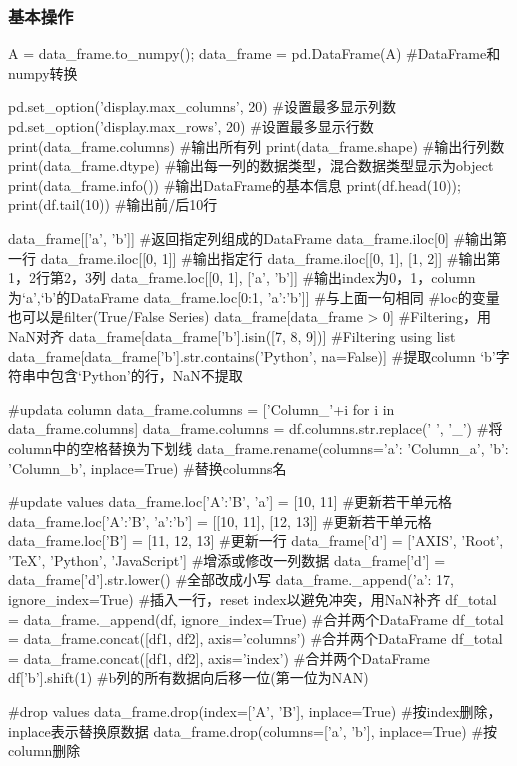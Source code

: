     \subsubsection{基本操作}
      \begin{codeblock}[language=python, caption={Basic functions about DataFrame}]
        A = data_frame.to_numpy(); data_frame = pd.DataFrame(A) #DataFrame和numpy转换

        pd.set_option('display.max_columns', 20) #设置最多显示列数
        pd.set_option('display.max_rows', 20) #设置最多显示行数
        print(data_frame.columns) #输出所有列
        print(data_frame.shape) #输出行列数
        print(data_frame.dtype) #输出每一列的数据类型，混合数据类型显示为object
        print(data_frame.info()) #输出DataFrame的基本信息
        print(df.head(10)); print(df.tail(10)) #输出前/后10行

        data_frame[['a', 'b']] #返回指定列组成的DataFrame
        data_frame.iloc[0] #输出第一行
        data_frame.iloc[[0, 1]] #输出指定行
        data_frame.iloc[[0, 1], [1, 2]] #输出第1，2行第2，3列
        data_frame.loc[[0, 1], ['a', 'b']] #输出index为0，1，column为`a',`b'的DataFrame
        data_frame.loc[0:1, 'a':'b']] #与上面一句相同
            #loc的变量也可以是filter(True/False Series)
        data_frame[data_frame > 0] #Filtering，用NaN对齐
        data_frame[data_frame['b'].isin([7, 8, 9])] #Filtering using list
        data_frame[data_frame['b'].str.contains('Python', na=False)] 
            #提取column `b'字符串中包含`Python'的行，NaN不提取

        #updata column
        data_frame.columns = ['Column_'+i for i in data_frame.columns]
        data_frame.columns = df.columns.str.replace(' ', '_') #将column中的空格替换为下划线
        data_frame.rename(columns={'a': 'Column_a', 'b': 'Column_b'}, inplace=True) 
            #替换columns名

        #update values
        data_frame.loc['A':'B', 'a'] = [10, 11] #更新若干单元格
        data_frame.loc['A':'B', 'a':'b'] = [[10, 11], [12, 13]] #更新若干单元格
        data_frame.loc['B'] = [11, 12, 13] #更新一行
        data_frame['d'] = ['AXIS', 'Root', 'TeX', 'Python', 'JavaScript'] #增添或修改一列数据
        data_frame['d'] = data_frame['d'].str.lower() #全部改成小写
        data_frame._append({'a': 17}, ignore_index=True) #插入一行，reset index以避免冲突，用NaN补齐
        df_total = data_frame._append(df, ignore_index=True) #合并两个DataFrame
        df_total = data_frame.concat([df1, df2], axis='columns') #合并两个DataFrame
        df_total = data_frame.concat([df1, df2], axis='index') #合并两个DataFrame
        df['b'].shift(1) #b列的所有数据向后移一位(第一位为NAN)

        #drop values
        data_frame.drop(index=['A', 'B'], inplace=True) #按index删除，inplace表示替换原数据
        data_frame.drop(columns=['a', 'b'], inplace=True) #按column删除
      \end{codeblock}

